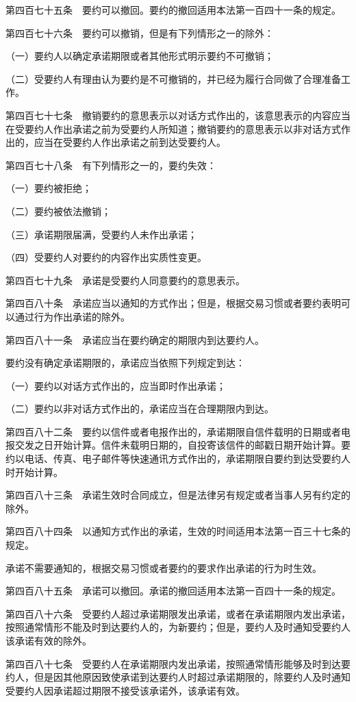 \documentclass[UTF8,12pt,a4paper]{ctexbook}
\begin{document}
第四百七十五条　要约可以撤回。要约的撤回适用本法第一百四十一条的规定。

第四百七十六条　要约可以撤销，但是有下列情形之一的除外：

（一）要约人以确定承诺期限或者其他形式明示要约不可撤销；

（二）受要约人有理由认为要约是不可撤销的，并已经为履行合同做了合理准备工作。

第四百七十七条　撤销要约的意思表示以对话方式作出的，该意思表示的内容应当在受要约人作出承诺之前为受要约人所知道；撤销要约的意思表示以非对话方式作出的，应当在受要约人作出承诺之前到达受要约人。

第四百七十八条　有下列情形之一的，要约失效：

（一）要约被拒绝；

（二）要约被依法撤销；

（三）承诺期限届满，受要约人未作出承诺；

（四）受要约人对要约的内容作出实质性变更。

第四百七十九条　承诺是受要约人同意要约的意思表示。

第四百八十条　承诺应当以通知的方式作出；但是，根据交易习惯或者要约表明可以通过行为作出承诺的除外。

第四百八十一条　承诺应当在要约确定的期限内到达要约人。

要约没有确定承诺期限的，承诺应当依照下列规定到达：

（一）要约以对话方式作出的，应当即时作出承诺；

（二）要约以非对话方式作出的，承诺应当在合理期限内到达。

第四百八十二条　要约以信件或者电报作出的，承诺期限自信件载明的日期或者电报交发之日开始计算。信件未载明日期的，自投寄该信件的邮戳日期开始计算。要约以电话、传真、电子邮件等快速通讯方式作出的，承诺期限自要约到达受要约人时开始计算。

第四百八十三条　承诺生效时合同成立，但是法律另有规定或者当事人另有约定的除外。

第四百八十四条　以通知方式作出的承诺，生效的时间适用本法第一百三十七条的规定。

承诺不需要通知的，根据交易习惯或者要约的要求作出承诺的行为时生效。

第四百八十五条　承诺可以撤回。承诺的撤回适用本法第一百四十一条的规定。

第四百八十六条　受要约人超过承诺期限发出承诺，或者在承诺期限内发出承诺，按照通常情形不能及时到达要约人的，为新要约；但是，要约人及时通知受要约人该承诺有效的除外。

第四百八十七条　受要约人在承诺期限内发出承诺，按照通常情形能够及时到达要约人，但是因其他原因致使承诺到达要约人时超过承诺期限的，除要约人及时通知受要约人因承诺超过期限不接受该承诺外，该承诺有效。
\end{document}

